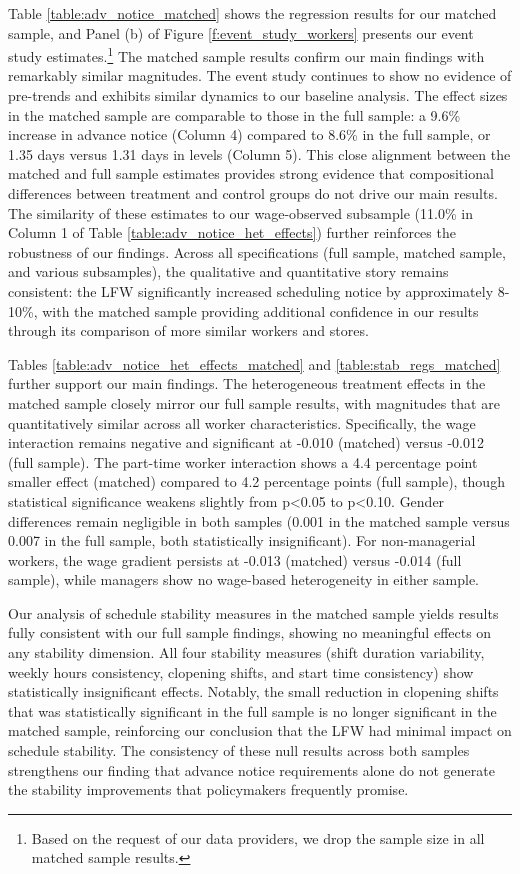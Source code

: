 \documentclass[letterpaper,11pt,leqno]{article}
\theoremstyle{paper}
\begin{document}
Table \ref{table:adv_notice_matched} shows the regression results for our matched sample, and Panel (b) of Figure \ref{f:event_study_workers} presents our event study estimates.\footnote{Based on the request of our data providers, we drop the sample size in all matched sample results.} The matched sample results confirm our main findings with remarkably similar magnitudes. The event study continues to show no evidence of pre-trends and exhibits similar dynamics to our baseline analysis. The effect sizes in the matched sample are comparable to those in the full sample: a 9.6\% increase in advance notice (Column 4) compared to 8.6\% in the full sample, or 1.35 days versus 1.31 days in levels (Column 5). This close alignment between the matched and full sample estimates provides strong evidence that compositional differences between treatment and control groups do not drive our main results. The similarity of these estimates to our wage-observed subsample (11.0\% in Column 1 of Table \ref{table:adv_notice_het_effects}) further reinforces the robustness of our findings. Across all specifications (full sample, matched sample, and various subsamples), the qualitative and quantitative story remains consistent: the LFW significantly increased scheduling notice by approximately 8-10\%, with the matched sample providing additional confidence in our results through its comparison of more similar workers and stores.

Tables \ref{table:adv_notice_het_effects_matched} and \ref{table:stab_regs_matched} further support our main findings. The heterogeneous treatment effects in the matched sample closely mirror our full sample results, with magnitudes that are quantitatively similar across all worker characteristics. Specifically, the wage interaction remains negative and significant at -0.010 (matched) versus -0.012 (full sample). The part-time worker interaction shows a 4.4 percentage point smaller effect (matched) compared to 4.2 percentage points (full sample), though statistical significance weakens slightly from p<0.05 to p<0.10. Gender differences remain negligible in both samples (0.001 in the matched sample versus 0.007 in the full sample, both statistically insignificant). For non-managerial workers, the wage gradient persists at -0.013 (matched) versus -0.014 (full sample), while managers show no wage-based heterogeneity in either sample. 

Our analysis of schedule stability measures in the matched sample yields results fully consistent with our full sample findings, showing no meaningful effects on any stability dimension. All four stability measures (shift duration variability, weekly hours consistency, clopening shifts, and start time consistency) show statistically insignificant effects. Notably, the small reduction in clopening shifts that was statistically significant in the full sample is no longer significant in the matched sample, reinforcing our conclusion that the LFW had minimal impact on schedule stability. The consistency of these null results across both samples strengthens our finding that advance notice requirements alone do not generate the stability improvements that policymakers frequently promise.
\end{document}
